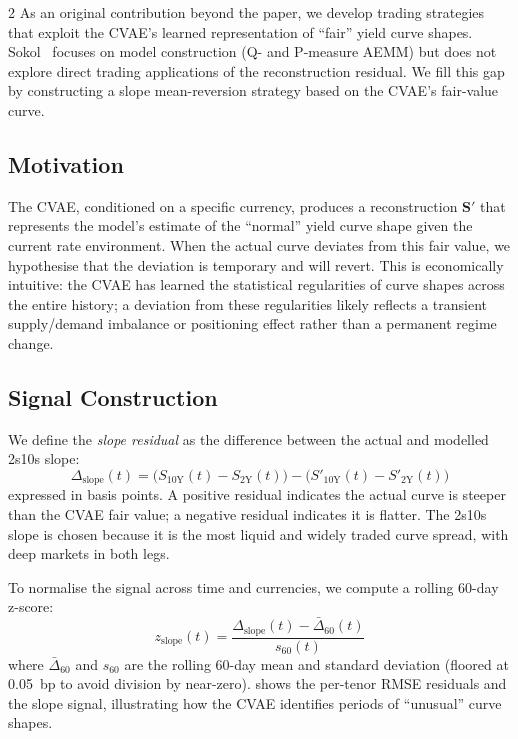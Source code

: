 \documentclass[10pt,a4paper]{article}
\theoremstyle{plain}
\theoremstyle{definition}
\begin{document}
\begin{multicols}{2}
As an original contribution beyond the paper, we develop trading strategies that exploit the CVAE's learned representation of ``fair'' yield curve shapes. Sokol~\cite{sokol2022} focuses on model construction (Q- and P-measure AEMM) but does not explore direct trading applications of the reconstruction residual. We fill this gap by constructing a slope mean-reversion strategy based on the CVAE's fair-value curve.

\subsection{Motivation}

The CVAE, conditioned on a specific currency, produces a reconstruction $\mathbf{S}'$ that represents the model's estimate of the ``normal'' yield curve shape given the current rate environment. When the actual curve deviates from this fair value, we hypothesise that the deviation is temporary and will revert. This is economically intuitive: the CVAE has learned the statistical regularities of curve shapes across the entire history; a deviation from these regularities likely reflects a transient supply/demand imbalance or positioning effect rather than a permanent regime change.

\subsection{Signal Construction}

We define the \textit{slope residual} as the difference between the actual and modelled 2s10s slope:
\begin{equation}
\Delta_{\text{slope}}(t) = \bigl(S_{10\text{Y}}(t) - S_{2\text{Y}}(t)\bigr) - \bigl(S'_{10\text{Y}}(t) - S'_{2\text{Y}}(t)\bigr)
\end{equation}
expressed in basis points. A positive residual indicates the actual curve is steeper than the CVAE fair value; a negative residual indicates it is flatter. The 2s10s slope is chosen because it is the most liquid and widely traded curve spread, with deep markets in both legs.

To normalise the signal across time and currencies, we compute a rolling 60-day z-score:
\begin{equation}
z_{\text{slope}}(t) = \frac{\Delta_{\text{slope}}(t) - \bar{\Delta}_{60}(t)}{s_{60}(t)}
\end{equation}
where $\bar{\Delta}_{60}$ and $s_{60}$ are the rolling 60-day mean and standard deviation (floored at 0.05~bp to avoid division by near-zero).  shows the per-tenor RMSE residuals and the slope signal, illustrating how the CVAE identifies periods of ``unusual'' curve shapes.


\end{multicols}
\end{document}
